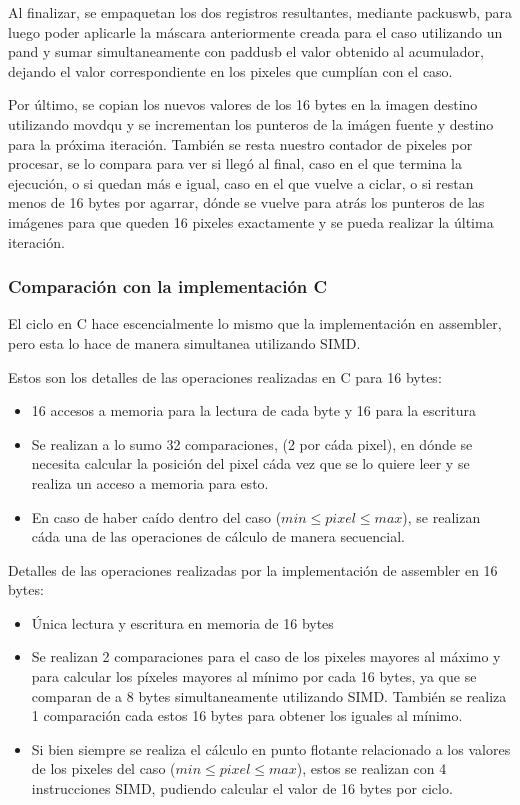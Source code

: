 Al finalizar, se empaquetan los dos registros resultantes, mediante packuswb, para luego poder aplicarle la máscara anteriormente creada para el caso utilizando un pand y sumar simultaneamente con paddusb el valor obtenido al acumulador, dejando el valor correspondiente en los pixeles que cumplían con el caso.

Por último, se copian los nuevos valores de los 16 bytes en la imagen destino utilizando movdqu y se incrementan los punteros de la imágen fuente y destino para la próxima iteración. También se resta nuestro contador de pixeles por procesar, se lo compara para ver si llegó al final, caso en el que termina la ejecución, o si quedan más e igual, caso en el que vuelve a ciclar, o si restan menos de 16 bytes por agarrar, dónde se vuelve para atrás los punteros de las imágenes para que queden 16 pixeles exactamente y se pueda realizar la última iteración.

\subsubsection{Comparación con la implementación C}
El ciclo en C hace escencialmente lo mismo que la implementación en assembler, pero esta lo hace de manera simultanea utilizando SIMD. 

Estos son los detalles de las operaciones realizadas en C para 16 bytes:
\begin{itemize}
\item 16 accesos a memoria para la lectura de cada byte y 16 para la escritura
\item Se realizan a lo sumo 32 comparaciones, (2 por cáda pixel), en dónde se necesita calcular la posición del pixel cáda vez que se lo quiere leer y se realiza un acceso a memoria para esto.
\item En caso de haber caído dentro del caso ($min \leq pixel \leq max$), se realizan cáda una de las operaciones de cálculo de manera secuencial.
\end{itemize}
Detalles de las operaciones realizadas por la implementación de assembler en 16 bytes:
\begin{itemize}
\item Única lectura y escritura en memoria de 16 bytes
\item Se realizan 2 comparaciones para el caso de los pixeles mayores al máximo y para calcular los píxeles mayores al mínimo por cada 16 bytes, ya que se comparan de a 8 bytes simultaneamente utilizando SIMD. También se realiza 1 comparación cada estos 16 bytes para obtener los iguales al mínimo.
\item Si bien siempre se realiza el cálculo en punto flotante relacionado a los valores de los pixeles del caso ($min \leq pixel \leq max$), estos se realizan con 4 instrucciones SIMD, pudiendo calcular el valor de 16 bytes por ciclo.
\end{itemize}

